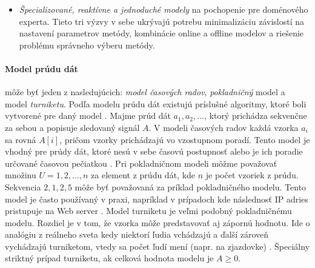 \begin{itemize}
	\item \textit{Špecializované, reaktívne a jednoduché modely} na pochopenie pre doménového experta. Tieto tri výzvy v sebe ukrývajú potrebu minimalizáciu závislostí na nastavení parametrov metódy, kombinácie online a offline modelov a riešenie problému správneho výberu metódy.
\end{itemize}

\paragraph{Model prúdu dát} môže byť jeden z nasledujúcich: \textit{model časových radov}, \textit{pokladničný} model a model \textit{turniketu}. Podľa modelu prúdu dát existujú príslušné algoritmy, ktoré boli vytvorené pre daný model \citep{tran2014change}. Majme prúd dát $a_1, a_2, ...$, ktorý prichádza sekvenčne za sebou a popisuje sledovaný signál $A$. 
V modeli časových radov každá vzorka $a_i$ sa rovná $A[i]$, pričom vzorky prichádzajú vo vzostupnom poradí. Tento model je vhodný pre prúdy dát, ktoré nesú v sebe časovú postupnosť alebo je ich poradie určované časovou pečiatkou \citep{muthukrishnan2005data}.
Pri pokladničnom modeli môžme považovať množinu $U = {1, 2, ..., n}$ za element z prúdu dát, kde $n$ je počet vzoriek z prúdu. Sekvencia $2, 1, 2, 5$ môže byť považovaná za príklad pokladničného modelu. Tento model je často používaný v praxi, napríklad v prípadoch kde následnosť IP adries pristupuje na Web server \citep{ikonomovska2013algorithmic, muthukrishnan2005data}.
Model turniketu je veľmi podobný pokladničnému modelu. Rozdiel je v tom, že vzorka môže predstavovať aj zápornú hodnotu. Ide o analógiu z reálneho sveta kedy niektorí ľudia vchádzajú a ďalší zároveň vychádzajú turniketom, vtedy sa počet ľudí mení (napr. na zjazdovke) \citep{ikonomovska2013algorithmic, muthukrishnan2005data}. Špeciálny striktný prípad turniketu, ak celková hodnota modelu je $A \geq 0$.

